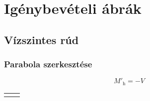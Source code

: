 \section{Igénybevételi ábrák}

\pgfmathsetmacro{\framewidth}{.7mm}

\subsection{Vízszintes rúd}

\subsubsection{Parabola szerkesztése}

$${M'}_\text{h} = -V$$
\begin{tabularx}{\textwidth}{X | X}
	\makecell{$2.5x^2 - 4.5x + 1.8$} & \makecell{$2.5x^2 - 4.5x + 1.8$} \\
	\hline
	\makecell{
		$\begin{array}{rl}
	    & x_\text{1} = 0.6 \\
	    & x_\text{2} = 1.2 \\
	    \hline
	    & m_\text{1} = {M'}_\text{h}(x)|_{x=x_\text{1}} = -\frac{3}{2} \\
			\Rightarrow & m_\text{1} : -\frac{3}{2} \times x + 0.9 \\
				    & m_\text{2} = {M'}_\text{h}(x)|_{x=x_\text{2}} = \frac{3}{2} \\
			\Rightarrow & m_\text{2} : \frac{3}{2} \times x - 1.8 \\
				    & y_\text{0} = M_\text{h}(\frac{x_\text{1} + x_\text{2}}{2}) = -0.225 \\
	    \hline
				    &M'_\text{h}(x^*) = 0 \\
				    &x^* = 0.9 \\
				    &M_\text{h}(x^*) = -0.225
		\end{array}$
	} & 
	\makecell{
		$\begin{array}{rl}
	    & x_\text{1} = 1.2 \\
	    & x_\text{2} = 2.2 \\
	    \hline
	    & m_\text{1} = {M'}_\text{h}(x)|_{x=x_\text{1}} = -\frac{5}{2} \\
			\Rightarrow & m_\text{1} : -\frac{5}{2} \times x + 3 \\
				    & m_\text{2} = {M'}_\text{h}(x)|_{x=x_\text{2}} = \frac{5}{2} \\
			\Rightarrow & m_\text{2} : \frac{5}{2} \times x - 5.5 \\
				    & y_\text{0} = M_\text{h}(\frac{x_\text{1} + x_\text{2}}{2}) = -0.46875 \\
	    \hline
				    &M'_\text{h}(x_\text{0}) = 0 \\
				    &x_\text{0} = 1.7
		\end{array}$
	} \\
\end{tabularx}


